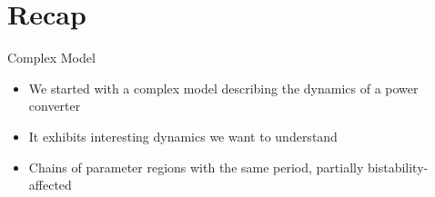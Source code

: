 \section{Recap}

\begin{frame}{Complex Model}
	\vspace{-1em}
	\begin{itemize}
		\item We started with a complex model describing the dynamics of a power converter
		\item It exhibits interesting dynamics we want to understand
		\item Chains of parameter regions with the same period, partially bistability-affected
	\end{itemize}
	\vspace{-.5em}
	\begin{figure}
	\end{figure}
\end{frame}

